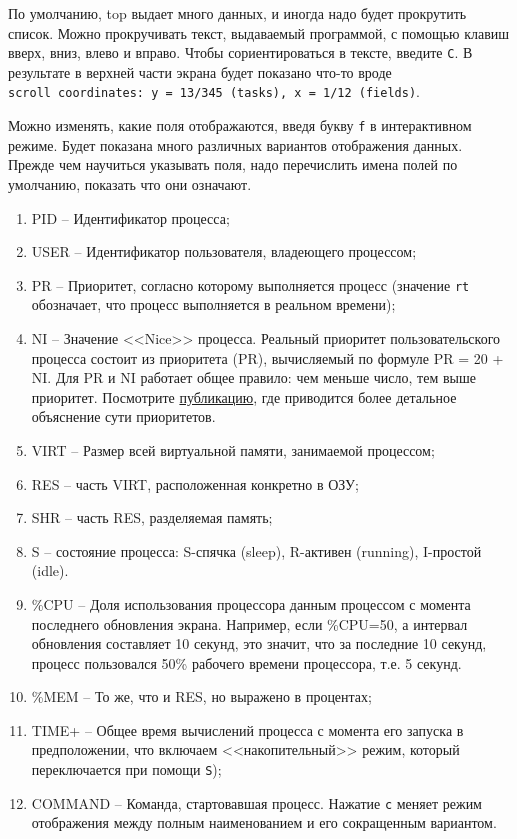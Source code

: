 \documentclass[a4paper,12pt,final,openany]{extbook}
\providecommand{\tightlist}{%
  \setlength{\itemsep}{0pt}\setlength{\parskip}{0pt}}
\begin{document}
По умолчанию, top выдает много данных, и иногда надо будет прокрутить
список. Можно прокручивать текст, выдаваемый программой, с помощью
клавиш вверх, вниз, влево и вправо. Чтобы сориентироваться в тексте,
введите \texttt{C}. В результате в верхней части экрана будет показано
что-то вроде
\texttt{scroll\ coordinates:\ y\ =\ 13/345\ (tasks),\ x\ =\ 1/12\ (fields)}.

Можно изменять, какие поля отображаются, введя букву \texttt{f} в
интерактивном режиме. Будет показана
много различных вариантов отображения данных. Прежде чем научиться
указывать поля, надо перечислить имена полей по умолчанию, показать что
они означают.
\begin{enumerate}
\tightlist
\item
  PID -- Идентификатор процесса;
\item
  USER -- Идентификатор пользователя, владеющего процессом;
\item
  PR -- Приоритет, согласно которому выполняется процесс (значение
  \texttt{rt} обозначает, что процесс выполняется в реальном времени);
\item
  NI -- Значение <<Nice>> процесса. Реальный приоритет пользовательского
  процесса состоит из приоритета (PR), вычисляемый по формуле PR = 20 +
  NI. Для PR и NI работает общее правило: чем меньше число, тем выше
  приоритет. Посмотрите
  \href{https://askubuntu.com/a/656787/917201}{публикацию}, где
  приводится более детальное объяснение сути приоритетов.
\item
  VIRT -- Размер всей виртуальной памяти, занимаемой процессом;
\item
  RES -- часть VIRT, расположенная конкретно в ОЗУ;
\item
  SHR -- часть RES, разделяемая память;
\item
  S -- состояние процесса: S-спячка (sleep), R-активен (running),  I-простой (idle).
\item
  \%CPU -- Доля использования процессора данным процессом с момента
  последнего обновления экрана. Например, если \%CPU=50, а интервал
  обновления составляет 10 секунд, это значит, что за последние 10
  секунд, процесс пользовался 50\% рабочего времени процессора, т.е. 5
  секунд.
\item
  \%MEM -- То же, что и RES, но выражено в процентах;
\item
  TIME+ -- Общее время вычислений процесса с момента его запуска в предположении, что включаем <<накопительный>> режим, который
  переключается при помощи \texttt{S});
\item
  COMMAND -- Команда, стартовавшая процесс. Нажатие \texttt{c} меняет
  режим отображения между полным наименованием и его сокращенным
  вариантом.
\end{enumerate}
\end{document}
